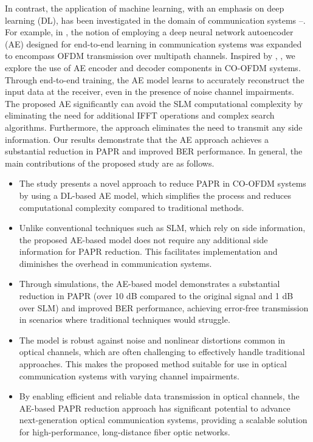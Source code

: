 \documentclass[conference]{IEEEtran}
\begin{document}
In contrast, the application of machine learning, with an emphasis on deep learning (DL), has been investigated in the domain of communication systems \cite{b12}--\cite{b14}. For example, in \cite{b15}, the notion of employing a deep neural network autoencoder (AE) designed for end-to-end learning in communication systems was expanded to encompass OFDM transmission over multipath channels. Inspired by \cite{b16}, \cite{b17}, we explore the use of AE encoder and decoder components in CO-OFDM systems. Through end-to-end training, the AE model learns to accurately reconstruct the input data at the receiver, even in the presence of noise channel impairments. The proposed AE significantly can avoid the SLM computational complexity by eliminating the need for additional IFFT operations and complex search algorithms. Furthermore, the approach eliminates the need to transmit any side information. Our results demonstrate that the AE approach achieves a substantial reduction in PAPR and improved BER performance. In general, the main contributions of the proposed study are as follows.

\begin{itemize}
    \item The study presents a novel approach to reduce PAPR in CO-OFDM systems by using a DL-based AE model, which simplifies the process and reduces computational complexity compared to traditional methods.
    \item Unlike conventional techniques such as SLM, which rely on side information, the proposed AE-based model does not require any additional side information for PAPR reduction. This facilitates implementation and diminishes the overhead in communication systems.
    \item Through simulations, the AE-based model demonstrates a substantial reduction in PAPR (over 10 dB compared to the original signal and 1 dB over SLM) and improved BER performance, achieving error-free transmission in scenarios where traditional techniques would struggle.
    \item The model is robust against noise and nonlinear distortions common in optical channels, which are often challenging to effectively handle traditional approaches. This makes the proposed method suitable for use in optical communication systems with varying channel impairments.
    \item By enabling efficient and reliable data transmission in optical channels, the AE-based PAPR reduction approach has significant potential to advance next-generation optical communication systems, providing a scalable solution for high-performance, long-distance fiber optic networks.
\end{itemize}
\end{document}
